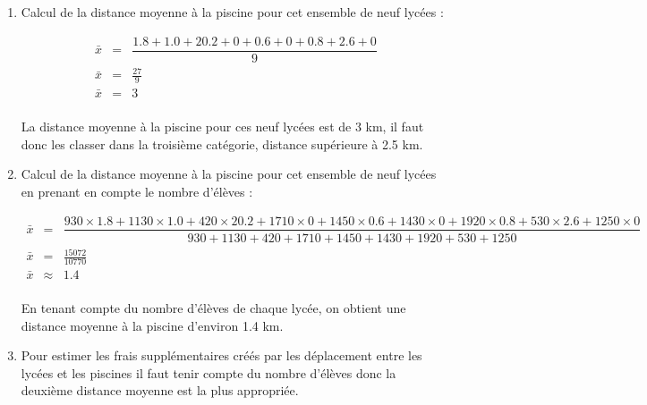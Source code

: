 \documentclass[12pt,a4paper]{article}
\begin{document}
\begin{enumerate}[label=\arabic*°]
	\item Calcul de la distance moyenne à la piscine pour cet ensemble de neuf lycées :
	
	\begin{eqnarray*}
		\bar{x} & = & \dfrac{\num{1.8} + \num{1.0} + \num{20.2} + \num{0} + \num{0.6} + \num{0} + \num{0.8} + \num{2.6} + \num{0}}{9} \\
		\bar{x} & = & \frac{27}{9} \\
		\bar{x} & = & 3 \\
	\end{eqnarray*}

	La distance moyenne à la piscine pour ces neuf lycées est de 3 km, il faut donc les classer dans la troisième catégorie, distance supérieure à \num{2.5} km.
	
	\item Calcul de la distance moyenne à la piscine pour cet ensemble de neuf lycées en prenant en compte le nombre d'élèves :
	
	\begin{small}
		\begin{eqnarray*}
			\bar{x} & = & \dfrac{\num{930} \times \num{1.8} + \num{1130} \times \num{1.0} + \num{420} \times \num{20.2} + \num{1710} \times \num{0} + \num{1450} \times \num{0.6} + \num{1430} \times \num{0} + \num{1920} \times \num{0.8} + \num{530} \times \num{2.6} + \num{1250} \times \num{0}}{\num{930} + \num{1130} + \num{420}  + \num{1710} + \num{1450} + \num{1430} + \num{1920} + \num{530} + \num{1250} } \\
			\bar{x} & = & \frac{15072}{10770} \\
			\bar{x} & \approx & \num{1.4} \\
		\end{eqnarray*}
	\end{small}

	En tenant compte du nombre d'élèves de chaque lycée, on obtient une distance moyenne à la piscine d'environ \num{1.4} km.
	
	\item Pour estimer les frais supplémentaires créés par les déplacement entre les lycées et les piscines il faut tenir compte du nombre d'élèves donc la deuxième distance moyenne est la plus appropriée.
	
	  
\end{enumerate}
\end{document}
